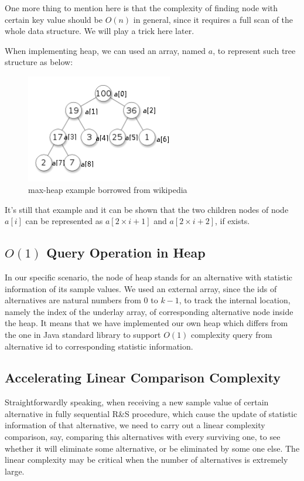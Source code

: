 One more thing to mention here is that the complexity of finding node with certain key value should be $O(n)$ in general, since it requires a full scan of the whole data structure. We will play a trick here later.

When implementing heap, we can used an array, named $a$, to represent such tree structure as below:

\begin{figure}[ht]
\centering
\includegraphics[width=64mm]{heap2.png}
\caption{max-heap example borrowed from wikipedia}
\end{figure}

It's still that example and it can be shown that the two children nodes of node $a[i]$ can be represented as $a[2 \times i + 1]$ and $a[2 \times i + 2]$, if exists.

\subsection{$O(1)$ Query Operation in Heap}

In our specific scenario, the node of heap stands for an alternative with statistic information of its sample values. We used an external array, since the ids of alternatives are natural numbers from $0$ to $k - 1$, to track the internal location, namely the index of the underlay array, of corresponding alternative node inside the heap. It means that we have implemented our own heap which differs from the one in Java standard library to support $O(1)$ complexity query from alternative id to corresponding statistic information.

\subsection{Accelerating Linear Comparison Complexity}

Straightforwardly speaking, when receiving a new sample value of certain alternative in fully sequential R\&S procedure, which cause the update of statistic information of that alternative, we need to carry out a linear complexity comparison, say, comparing this alternatives with every surviving one, to see whether it will eliminate some alternative, or be eliminated by some one else. The linear complexity may be critical when the number of alternatives is extremely large.

